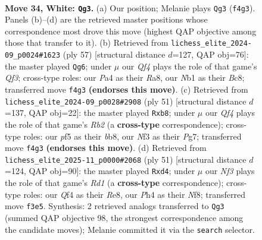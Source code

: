 \documentclass[11pt]{article}
\begin{document}
\clearpage

\begin{figure}[p]\centering
\begin{subfigure}{0.46\textwidth}\centering
\resizebox{\linewidth}{!}{%
\newchessgame
\chessboard[
  setfen={r1b3k1/3pr1bp/pq2p3/5p1B/P1np1Q1P/5N2/1P3P2/RNBR1K2 w - - 2 34},
  showmover=false,
  pgfstyle=straightmove, color=movearrow, markmove={f4-g3}
]}
\caption{}
\end{subfigure}\hfill
\begin{subfigure}{0.46\textwidth}\centering
\resizebox{\linewidth}{!}{%
\newchessgame
\chessboard[
  setfen={r1b1r1k1/p4pp1/2P2q1p/3p4/Q2Nn2P/4P3/1PR2PP1/4KB1R b K - 8 29},
  showmover=false,
  pgfstyle=straightmove, color=movearrow, markmove={f6-g6}
]}
\caption{}
\end{subfigure}
\\[4pt]
\begin{subfigure}{0.46\textwidth}\centering
\resizebox{\linewidth}{!}{%
\newchessgame
\chessboard[
  setfen={1B2k2r/1r2b1pp/bn2P3/p1p3q1/P7/2N2Q2/5PPP/R3R1K1 b - - 2 26},
  showmover=false,
  pgfstyle=straightmove, color=movearrow, markmove={b7-b8}
]}
\caption{}
\end{subfigure}\hfill
\begin{subfigure}{0.46\textwidth}\centering
\resizebox{\linewidth}{!}{%
\newchessgame
\chessboard[
  setfen={3rrnk1/pp3bpn/8/q3P3/P1pN1PP1/2P4Q/2BB1R1P/R5K1 b - - 0 26},
  showmover=false,
  pgfstyle=straightmove, color=movearrow, markmove={d8-d4}
]}
\caption{}
\end{subfigure}
\caption{\textbf{Move 34, White: \texttt{Qg3}.} (a) Our position; Melanie plays \texttt{Qg3} (\texttt{f4g3}). Panels (b)--(d) are the retrieved master positions whose correspondence most drove this move (highest QAP objective among those that transfer to it). (b) Retrieved from \texttt{lichess\_elite\_2024-09\_p0024\#1623} (ply 57) [structural distance $d$=127, QAP obj=76]: the master played \texttt{Qg6}; under $\mu$ our \emph{Qf4} plays the role of that game's \emph{Qf3}; cross-type roles: our \emph{P}a4 as their \emph{R}a8, our \emph{N}b1 as their \emph{B}c8; transferred move \texttt{f4g3} \textbf{(endorses this move)}. (c) Retrieved from \texttt{lichess\_elite\_2024-09\_p0028\#2908} (ply 51) [structural distance $d$=137, QAP obj=22]: the master played \texttt{Rxb8}; under $\mu$ our \emph{Qf4} plays the role of that game's \emph{Rb2} (a \textbf{cross-type} correspondence); cross-type roles: our \emph{p}f5 as their \emph{b}b8, our \emph{N}f3 as their \emph{P}g7; transferred move \texttt{f4g3} \textbf{(endorses this move)}. (d) Retrieved from \texttt{lichess\_elite\_2025-11\_p0000\#2068} (ply 51) [structural distance $d$=124, QAP obj=90]: the master played \texttt{Rxd4}; under $\mu$ our \emph{Nf3} plays the role of that game's \emph{Rd1} (a \textbf{cross-type} correspondence); cross-type roles: our \emph{Q}f4 as their \emph{R}e8, our \emph{P}h4 as their \emph{N}f8; transferred move \texttt{f3e5}. Synthesis: 2 retrieved analogs transferred to \texttt{Qg3} (summed QAP objective 98, the strongest correspondence among the candidate moves); Melanie committed it via the \texttt{search} selector.}
\label{fig:thought-m66}
\end{figure}
\end{document}
